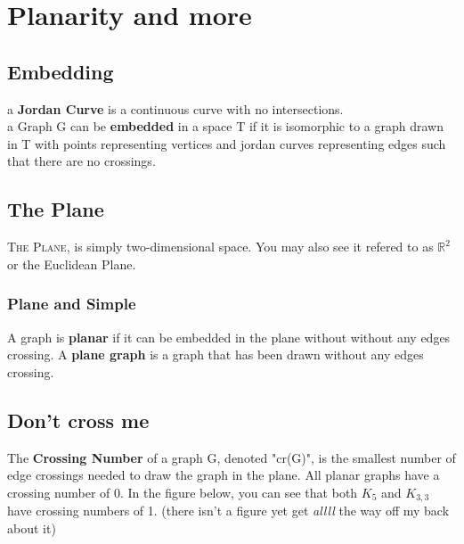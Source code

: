 \chapter{Planarity and more}
\section{Embedding}
a \textbf{Jordan Curve} is a continuous curve with no intersections.\\
a Graph G can be \textbf{embedded} in a space T if it is isomorphic to a graph drawn in T with points representing vertices and jordan curves representing edges such that there are no crossings.\\
\section{The Plane}
\lettrine[lines=4]{T}{he Plane}, is simply two-dimensional space. You may also see it refered to as $\mathbb{R}^2$ or the Euclidean Plane.\newline
\subsection{Plane and Simple}
A graph is \textbf{planar} if it can be embedded in the plane without without any edges crossing.\newline
A \textbf{plane graph} is a graph that has been drawn without any edges crossing.\newline
\begin{figure}[!ht]
	\centering
\end{figure}

\section{Don't cross me}
The \textbf{Crossing Number} of a graph G, denoted "cr(G)", is the smallest number of edge crossings needed to draw the graph in the plane.\newline
All planar graphs have a crossing number of 0. In the figure below, you can see that both $K_5$ and $K_{3,3}$ have crossing numbers of 1. (there isn't a figure yet get \textit{allll} the way off my back about it)

